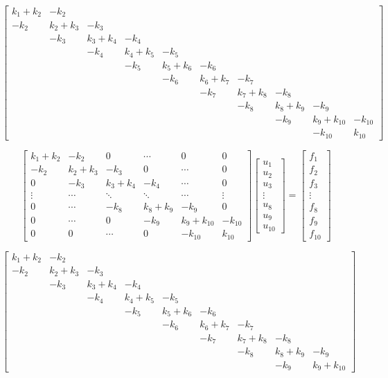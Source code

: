 \documentclass[a4paper, 12pt]{article}
\begin{document}
	$$\begin{bmatrix}
		k_1+k_2 & -k_2 & & & & & & & & \\ -k_2 & k_2+k_3 & -k_3 & & & & & & & \\ & -k_3 & k_3+k_4 & -k_4 & & & & & & \\
		& & -k_4 & k_4+k_5 & -k_5 & & & & & \\ & & & -k_5 & k_5+k_6 & -k_6 & & & & \\ & & & & -k_6 & k_6+k_7 & -k_7 & & & \\
		& & & & & -k_7 & k_7+k_8 & -k_8 & & \\ & & & & & & -k_8 & k_8+k_9 & -k_9 & \\ & & & & & & & -k_9 & k_9+k_{10} & 
		-k_{10} \\ & & & & & & & & -k_{10} & k_{10}
	\end{bmatrix}$$
		
	$$\begin{bmatrix}
		k_1+k_2 & -k_2 & 0 & \cdots & 0 & 0 \\ -k_2 & k_2+k_3 & -k_3 & 0 & \cdots & 0 \\ 0 & -k_3 & k_3+k_4 & -k_4 
		& \cdots & 0 \\ \vdots & \cdots & \ddots & \ddots & \cdots & \vdots \\ 0 & \cdots & -k_8 & k_8+k_9 & -k_9 & 0 
		\\ 0 & \cdots & 0 & -k_9 & k_9+k_{10} & -k_{10}	\\ 0 & 0 & \cdots & 0 & -k_{10} & k_{10}
	\end{bmatrix} \begin{bmatrix} u_1 \\ u_2 \\ u_3 \\ \vdots \\ u_8 \\ u_9 \\ u_{10} \end{bmatrix}
	=\begin{bmatrix} f_1 \\ f_2 \\ f_3 \\ \vdots \\ f_8 \\ f_9 \\ f_{10}	\end{bmatrix}$$
	
	$$\begin{bmatrix}
		k_1+k_2 & -k_2 & & & & & & & \\ -k_2 & k_2+k_3 & -k_3 & & & & & & \\ & -k_3 & k_3+k_4 & -k_4 & & & & & \\
		& & -k_4 & k_4+k_5 & -k_5 & & & & \\ & & & -k_5 & k_5+k_6 & -k_6 & & & \\ & & & & -k_6 & k_6+k_7 & -k_7 & & \\
		& & & & & -k_7 & k_7+k_8 & -k_8 & \\ & & & & & & -k_8 & k_8+k_9 & -k_9 \\ & & & & & & & -k_9 & k_9+k_{10} 
	\end{bmatrix}$$
		
\end{document}
